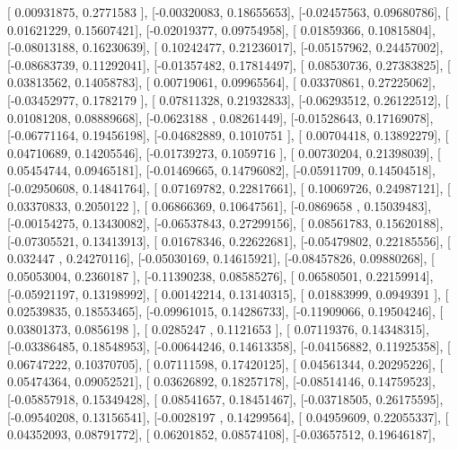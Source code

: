 \documentclass{article}
\begin{document}
       [ 0.00931875,  0.2771583 ],
       [-0.00320083,  0.18655653],
       [-0.02457563,  0.09680786],
       [ 0.01621229,  0.15607421],
       [-0.02019377,  0.09754958],
       [ 0.01859366,  0.10815804],
       [-0.08013188,  0.16230639],
       [ 0.10242477,  0.21236017],
       [-0.05157962,  0.24457002],
       [-0.08683739,  0.11292041],
       [-0.01357482,  0.17814497],
       [ 0.08530736,  0.27383825],
       [ 0.03813562,  0.14058783],
       [ 0.00719061,  0.09965564],
       [ 0.03370861,  0.27225062],
       [-0.03452977,  0.1782179 ],
       [ 0.07811328,  0.21932833],
       [-0.06293512,  0.26122512],
       [ 0.01081208,  0.08889668],
       [-0.0623188 ,  0.08261449],
       [-0.01528643,  0.17169078],
       [-0.06771164,  0.19456198],
       [-0.04682889,  0.1010751 ],
       [ 0.00704418,  0.13892279],
       [ 0.04710689,  0.14205546],
       [-0.01739273,  0.1059716 ],
       [ 0.00730204,  0.21398039],
       [ 0.05454744,  0.09465181],
       [-0.01469665,  0.14796082],
       [-0.05911709,  0.14504518],
       [-0.02950608,  0.14841764],
       [ 0.07169782,  0.22817661],
       [ 0.10069726,  0.24987121],
       [ 0.03370833,  0.2050122 ],
       [ 0.06866369,  0.10647561],
       [-0.0869658 ,  0.15039483],
       [-0.00154275,  0.13430082],
       [-0.06537843,  0.27299156],
       [ 0.08561783,  0.15620188],
       [-0.07305521,  0.13413913],
       [ 0.01678346,  0.22622681],
       [-0.05479802,  0.22185556],
       [ 0.032447  ,  0.24270116],
       [-0.05030169,  0.14615921],
       [-0.08457826,  0.09880268],
       [ 0.05053004,  0.2360187 ],
       [-0.11390238,  0.08585276],
       [ 0.06580501,  0.22159914],
       [-0.05921197,  0.13198992],
       [ 0.00142214,  0.13140315],
       [ 0.01883999,  0.0949391 ],
       [ 0.02539835,  0.18553465],
       [-0.09961015,  0.14286733],
       [-0.11909066,  0.19504246],
       [ 0.03801373,  0.0856198 ],
       [ 0.0285247 ,  0.1121653 ],
       [ 0.07119376,  0.14348315],
       [-0.03386485,  0.18548953],
       [-0.00644246,  0.14613358],
       [-0.04156882,  0.11925358],
       [ 0.06747222,  0.10370705],
       [ 0.07111598,  0.17420125],
       [ 0.04561344,  0.20295226],
       [ 0.05474364,  0.09052521],
       [ 0.03626892,  0.18257178],
       [-0.08514146,  0.14759523],
       [-0.05857918,  0.15349428],
       [ 0.08541657,  0.18451467],
       [-0.03718505,  0.26175595],
       [-0.09540208,  0.13156541],
       [-0.0028197 ,  0.14299564],
       [ 0.04959609,  0.22055337],
       [ 0.04352093,  0.08791772],
       [ 0.06201852,  0.08574108],
       [-0.03657512,  0.19646187],
\end{document}
